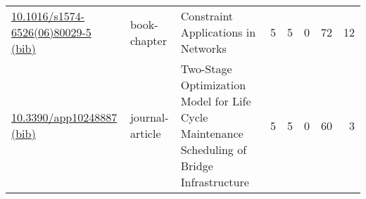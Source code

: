 {\begin{longtable}{p{5cm}lp{11cm}rrrrr}
\href{http://dx.doi.org/10.1016/s1574-6526(06)80029-5}{10.1016/s1574-6526(06)80029-5} \href{https://www.doi2bib.org/bib/10.1016/s1574-6526(06)80029-5}{(bib)} & book-chapter & Constraint Applications in Networks & 5 & 5 & 0 & 72 & 12 \\
\href{http://dx.doi.org/10.3390/app10248887}{10.3390/app10248887} \href{https://www.doi2bib.org/bib/10.3390/app10248887}{(bib)} & journal-article & Two-Stage Optimization Model for Life Cycle Maintenance Scheduling of Bridge Infrastructure & 5 & 5 & 0 & 60 & 3 \\
\end{longtable}
}

